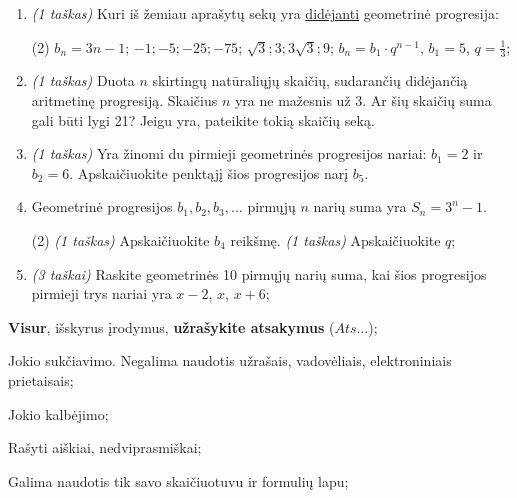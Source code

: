 \documentclass[a4paper]{article}
\begin{document}
\begin{enumerate}
      \item \textit{(1 taškas)} Kuri iš žemiau aprašytų sekų yra
            \underline{didėjanti} geometrinė progresija:
            \begin{tasks}[item-format={\normalfont}, after-item-skip=2mm,
                        label=\Alph*, label-format={\bfseries}](2)
                  \task $b_n = 3n-1$;
                  \task $-1; -5; -25; -75$;
                  \task $\sqrt{3}; 3; 3\sqrt{3}; 9$;
                  \task $b_n=b_1\cdot q^{n-1}$, $b_1 = 5$, $q = \frac{1}{3}$;
            \end{tasks}
      \item \textit{(1 taškas)}  Duota $n$ skirtingų natūraliųjų skaičių,
            sudarančių didėjančią
            aritmetinę progresiją. Skaičius $n$ yra ne mažesnis už 3. Ar šių
            skaičių suma
            gali būti lygi 21? Jeigu yra, pateikite tokią skaičių seką.
      \item \textit{(1 taškas)}  Yra žinomi du pirmieji geometrinės progresijos
            nariai: $b_1 = 2$ ir $b_2 = 6$. Apskaičiuokite penktąjį šios
            progresijos narį
            $b_5$.
      \item Geometrinė progresijos $b_1, b_2, b_3, \ldots$ pirmųjų $n$ narių
            suma yra $S_{n} = 3^{n}-1$.
            \begin{tasks}[item-format={\normalfont}, after-item-skip=2mm](2)
                  \task \textit{(1 taškas)} Apskaičiuokite $b_4$ reikšmę.
                  \task \textit{(1 taškas)} Apskaičiuokite $q$;
            \end{tasks}
      \item \textit{(3 taškai)} Raskite geometrinės 10 pirmųjų narių
            suma, kai šios progresijos pirmieji trys nariai yra $x-2$, $x$, $x+6$;
\end{enumerate}

\begin{small}
      \begin{enumerate*}[label={(\arabic*)}]
            \item \textbf{Visur}, išskyrus įrodymus, \textbf{užrašykite
                  atsakymus} ($Ats\ldots$);
            \item Jokio sukčiavimo. Negalima naudotis užrašais, vadovėliais,
            elektroniniais prietaisais;
            \item Jokio kalbėjimo;
            \item Rašyti aiškiai, nedviprasmiškai;
            \item Galima naudotis tik savo skaičiuotuvu ir formulių lapu;
      \end{enumerate*}
\end{small}
\end{document}
